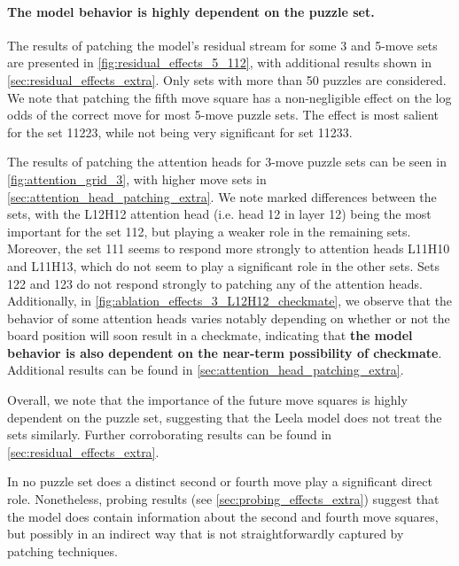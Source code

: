 \documentclass{article}
\begin{document}
\paragraph{The model behavior is highly dependent on the puzzle set.} The results of patching the model's residual stream for some 3 and 5-move sets are presented in \cref{fig:residual_effects_5_112}, with additional results shown in \cref{sec:residual_effects_extra}. Only sets with more than 50 puzzles are considered. We note that patching the fifth move square has a non-negligible effect on the log odds of the correct move for most 5-move puzzle sets. The effect is most salient for the set 11223, while not being very significant for set 11233.

The results of patching the attention heads for 3-move puzzle sets can be seen in \cref{fig:attention_grid_3}, with higher move sets in \cref{sec:attention_head_patching_extra}. We note marked differences between the sets, with the L12H12 attention head (i.e. head 12 in layer 12) being the most important for the set 112, but playing a weaker role in the remaining sets. Moreover, the set 111 seems to respond more strongly to attention heads L11H10 and L11H13, which do not seem to play a significant role in the other sets. Sets 122 and 123 do not respond strongly to patching any of the attention heads. Additionally, in \cref{fig:ablation_effects_3_L12H12_checkmate}, we observe that the behavior of some attention heads varies notably depending on whether or not the board position will soon result in a checkmate, indicating that \textbf{the model behavior is also dependent on the near-term possibility of checkmate}. Additional results can be found in \cref{sec:attention_head_patching_extra}.

Overall, we note that the importance of the future move squares is highly dependent on the puzzle set, suggesting that the Leela model does not treat the sets similarly. Further corroborating results can be found in \cref{sec:residual_effects_extra}.

In no puzzle set does a distinct second or fourth move play a significant direct role. Nonetheless, probing results (see \cref{sec:probing_effects_extra}) suggest that the model does contain information about the second and fourth move squares, but possibly in an indirect way that is not straightforwardly captured by patching techniques.
\end{document}
